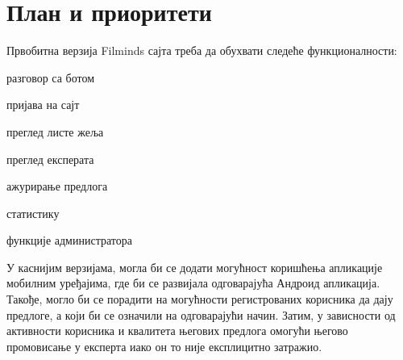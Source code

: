 \section{План и приоритети}
Првобитна верзија Filminds сајта треба да обухвати следеће функционалности:
\begin{description}[font=$\bullet$~\normalfont\scshape]
\item разговор са ботом 
\item пријава на сајт
\item преглед листе жеља
\item преглед експерата
\item ажурирање предлога
\item статистику
\item функције администратора
\end{description}

У каснијим верзијама, могла би се додати могућност коришћења апликације мобилним уређајима, где би се развијала одговарајућа Андроид апликација. Такође, могло би се порадити на могућности регистрованих корисника да дају предлоге, а који би се означили на одговарајући начин. Затим, у зависности од активности корисника и квалитета његових предлога омогући његово промовисање у експерта иако он то није експлицитно затражио. 